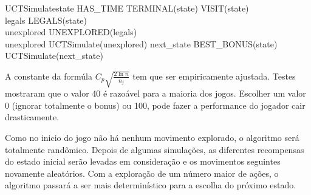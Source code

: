 \begin{pseudocode}{UCTSimulate}{state}
\WHILE HAS\_TIME \DO
\BEGIN
	\WHILE \NOT TERMINAL(state) \DO
		\BEGIN
		VISIT(state)\\
		legals \GETS LEGALS(state)\\
	    unexplored \GETS UNEXPLORED(legals)\\
		\IF unexplored
		\THEN
		\BEGIN
			UCTSimulate(unexplored)
		\END	
		\ELSE
		\BEGIN
			next\_state \GETS BEST\_BONUS(state)\\
			UCTSimulate(next\_state)\\
		\END
	\END
\END
\end{pseudocode}

A constante da formúla $C_{p}\sqrt{\frac{2\ln n}{n_{j}}}$ tem que ser empiricamente ajustada. Testes mostraram que o valor 40 é razoável para a maioria dos jogos. Escolher um valor 0 (ignorar totalmente o bonus) ou 100, pode fazer a performance do jogador cair drasticamente.

Como no inicio do jogo não há nenhum movimento explorado, o algoritmo será totalmente randômico. Depois de algumas simulações, as diferentes recompensas do estado inicial serão levadas em consideração e os movimentos seguintes novamente aleatórios. Com a exploração de um número maior de ações, o algoritmo passará a ser mais determinístico para a escolha do próximo estado.